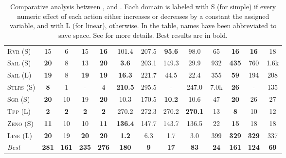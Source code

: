 \documentclass[11pt]{article}
\begin{document}
\begin{table*}[tb]
{\begin{tabular}{|l||cccc||cccc||cccc||}
\textsc{Rvr} (S)&15&6&15&\textbf{16}&101.4&207.5&\textbf{95.6}&98.0&65&\textbf{16}&\textbf{16}&18\\
\textsc{Sail} (S)&\textbf{20}&8&13&\textbf{20}&\textbf{3.6}&203.1&149.3&29.9&932&\textbf{435}&760&1.6k\\
\textsc{Sail} (L)&\textbf{19}&8&\textbf{19}&\textbf{19}&\textbf{16.3}&221.7&44.5&22.4&355&\textbf{59}&194&208\\
\textsc{Stlrs} (S)&\textbf{8}&1&-&4&\textbf{210.5}&295.5&-&247.0&7.0k&\textbf{26}&-&135\\
\textsc{Sgr} (S)&\textbf{20}&10&19&\textbf{20}&10.3&170.5&\textbf{10.2}&10.6&47&\textbf{20}&26&27\\
\textsc{Tpp} (L)&\textbf{2}&\textbf{2}&\textbf{2}&\textbf{2}&270.2&272.3&270.2&\textbf{270.1}&13&\textbf{8}&10&12\\
\textsc{Zeno} (S)&\textbf{11}&10&10&\textbf{11}&\textbf{136.4}&147.7&143.7&136.5&22&\textbf{15}&18&18\\
\textsc{Line} (L)&\textbf{20}&19&\textbf{20}&\textbf{20}&\textbf{1.2}&6.3&1.7&3.0&399&\textbf{329}&\textbf{329}&337
\\\hline
\textit{Best}&\textbf{281}&\textbf{161}&\textbf{235}&\textbf{276}&\textbf{180}&\textbf{9}&\textbf{17}&\textbf{83}&\textbf{24}&\textbf{161}&\textbf{124}&\textbf{69}\\\hline

        \end{tabular}}
        \caption{Comparative analysis between  \pattye, \pattym and \pattyi. Each domain is labeled with S (for simple) if every numeric effect of each action either increases or decreases by a constant the assigned variable, and with L (for linear), otherwise. In the table, names have been abbreviated to save space.  See \cite{ipc2023} for more details. Best results are in bold.}
        \label{tab:qual-plans}
        \end{table*}
        
\end{document}
